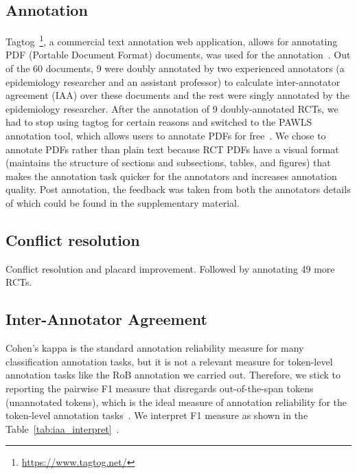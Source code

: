 \documentclass[sn-mathphys,Numbered]{sn-jnl}%
\theoremstyle{thmstyleone}%
\theoremstyle{thmstyletwo}%
\theoremstyle{thmstylethree}%
\begin{document}
\subsection{Annotation}
\label{annotation}
%
Tagtog~\footnote{\url{https://www.tagtog.net/}}, a commercial text annotation web application, allows for annotating PDF (Portable Document Format) documents, was used for the annotation~\cite{cejuela2014tagtog}.
Out of the 60 documents, 9 were doubly annotated by two experienced annotators (a epidemiology researcher and an assistant professor) to calculate inter-annotator agreement (IAA) over these documents and the rest were singly annotated by the epidemiology researcher.
After the annotation of 9 doubly-annotated RCTs, we had to stop using tagtog for certain reasons and switched to the PAWLS annotation tool, which allows users to annotate PDFs for free~\cite{neumann2021pawls}.
We chose to annotate PDFs rather than plain text because RCT PDFs have a visual format (maintains the structure of sections and subsections, tables, and figures) that makes the annotation task quicker for the annotators and increases annotation quality.
Post annotation, the feedback was taken from both the annotators details of which could be found in the supplementary material. %
%
%
%
\subsection{Conflict resolution}
\label{conflicts}
%
Conflict resolution and placard improvement.
Followed by annotating 49 more RCTs.
%
%
%
\subsection{Inter-Annotator Agreement}
\label{subsec:corpus}
%
Cohen's kappa is the standard annotation reliability measure for many classification annotation tasks, but it is not a relevant measure for token-level annotation tasks like the RoB annotation we carried out.
Therefore, we stick to reporting the pairwise F1 measure that disregards out-of-the-span tokens (unannotated tokens), which is the ideal measure of annotation reliability for the token-level annotation tasks~\cite{brandsen2020creating,deleger2012building}.
We interpret F1 measure as shown in the Table~\ref{tab:iaa_interpret}~\cite{landis1977measurement}.
\end{document}
